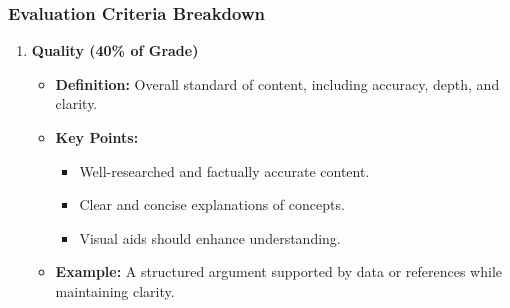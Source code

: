 \documentclass[aspectratio=169]{beamer}
\begin{document}
\begin{frame}[fragile]
    \frametitle{Evaluation Criteria Breakdown}
    \begin{enumerate}
        \item \textbf{Quality (40\% of Grade)}
        \begin{itemize}
            \item \textbf{Definition:} Overall standard of content, including accuracy, depth, and clarity.
            \item \textbf{Key Points:}
            \begin{itemize}
                \item Well-researched and factually accurate content.
                \item Clear and concise explanations of concepts.
                \item Visual aids should enhance understanding.
            \end{itemize}
            \item \textbf{Example:} A structured argument supported by data or references while maintaining clarity.
        \end{itemize}
    \end{enumerate}
\end{frame}
\end{document}

